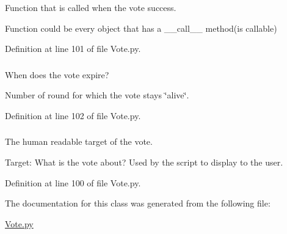 Function that is called when the vote success. 

Function could be every object that has a \_\-\_\-call\_\-\_\- method(is callable) 

Definition at line 101 of file Vote.py.

\hypertarget{class_vote_1_1_vote_af6004cd9228253e93b618b769dbc8855}{
\subsubsection[{aliveRounds}]{}}
\label{class_vote_1_1_vote_af6004cd9228253e93b618b769dbc8855}


When does the vote expire? 

Number of round for which the vote stays \char`\"{}alive\char`\"{}. 

Definition at line 102 of file Vote.py.

\hypertarget{class_vote_1_1_vote_afe0be7a3c2d7d0439a478b1ef0b30ed6}{
\subsubsection[{target}]{}}
\label{class_vote_1_1_vote_afe0be7a3c2d7d0439a478b1ef0b30ed6}


The human readable target of the vote. 

Target: What is the vote about? Used by the script to display to the user. 

Definition at line 100 of file Vote.py.



The documentation for this class was generated from the following file:\begin{DoxyCompactItemize}
\item 
\hyperlink{_vote_8py}{Vote.py}\end{DoxyCompactItemize}
